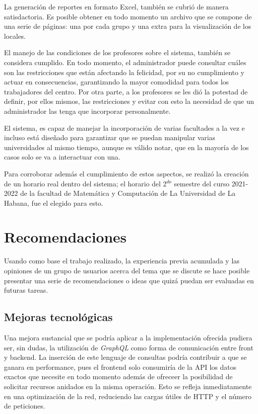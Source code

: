 La generación de reportes en formato Excel, también se cubrió de manera satisdactoria. Es posible obtener en todo momento un archivo que se compone de una serie de páginas: una por cada grupo y una extra para la visualización de los locales. 

El manejo de las condiciones de los profesores sobre el sistema, también se considera cumplido. En todo momento, el administrador puede consultar cuáles son las restricciones que están afectando la felicidad, por su no cumplimiento y actuar en consecuencias, garantizando la mayor comodidad para todos los trabajadores del centro. Por otra parte, a los profesores se les dió la potestad de definir, por ellos mismos, las restricciones y evitar con esto la necesidad de que un administrador las tenga que incorporar personalmente. 

El sistema, es capaz de manejar la incorporación de varias facultades a la vez e incluso está diseñado para garantizar que se puedan manipular varias universidades al mismo tiempo, aunque es válido notar, que en la mayoría de los casos solo se va a interactuar con una. 

Para corroborar además el cumplimiento de estos aspectos, se realizó la creación de un horario real dentro del sistema; el horario del 2$^{do}$ semestre del curso 2021-2022 de la facultad de Matemática y Computación de La Universidad de La Habana, fue el elegido para esto. 

\section{Recomendaciones}

Usando como base el trabajo realizado, la experiencia previa acumulada y las opiniones de un grupo de usuarios acerca del tema que se discute se hace posible presentar una serie de recomendaciones o ideas que quizá puedan ser evaluadas en futuras tareas.

\subsection{Mejoras tecnológicas}

Una mejora sustancial que se podría aplicar a la implementación ofrecida pudiera ser, sin dudas, la utilización de \textit{GraphQL} \cite{GraphQL_doc} como forma de comunicación entre front y backend. La inserción de este lenguaje de consultas podría contribuir a que se ganara en performance, pues el frontend solo consumiría de la API los datos exactos que necesite en todo momento además de ofreceer la posibilidad de solicitar recursos anidados en la misma operación. Esto se refleja inmediatamente en una optimización de la red, reduciendo las cargas útiles de HTTP y el número de peticiones. 

